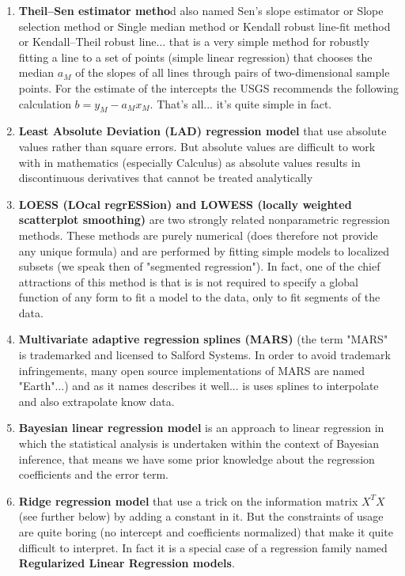 \begin{enumerate}
		\item \textbf{Theil–Sen estimator metho}d also named Sen's slope estimator or Slope selection method or Single median method or Kendall robust line-fit method or Kendall–Theil robust line... that is a very simple method for robustly fitting a line to a set of points (simple linear regression) that chooses the median $a_M$ of the slopes of all lines through pairs of two-dimensional sample points. For the estimate of the intercepts the USGS recommends the following calculation $b=y_M-a_Mx_M$. That's all... it's quite simple in fact.
		
		\item \textbf{Least Absolute Deviation (LAD) regression model} that use absolute values rather than square errors.  But absolute values are difficult to work with in mathematics (especially Calculus) as absolute values results in discontinuous derivatives that cannot be treated analytically
		
		\item \textbf{LOESS (LOcal regrESSion) and LOWESS (locally weighted scatterplot smoothing)} are two strongly related nonparametric regression methods. These methods are purely numerical (does therefore not provide any unique formula) and are performed by fitting simple models to localized subsets (we speak then of "segmented regression"). In fact, one of the chief attractions of this method is that is is not required to specify a global function of any form to fit a model to the data, only to fit segments of the data.
		
		\item \textbf{Multivariate adaptive regression splines (MARS)} (the term "MARS" is trademarked and licensed to Salford Systems. In order to avoid trademark infringements, many open source implementations of MARS are named "Earth"...) and as it names describes it well... is uses splines to interpolate and also extrapolate know data.
		
		\item \textbf{Bayesian linear regression model} is an approach to linear regression in which the statistical analysis is undertaken within the context of Bayesian inference, that means we have some prior knowledge about the regression coefficients and the error term.
		
		\item \textbf{Ridge regression model} that use a trick on the information matrix $X^TX$ (see further below) by adding a constant in it. But the constraints of usage are quite boring (no intercept and coefficients normalized) that make it quite difficult to interpret. In fact it is a special case of a regression family named \textbf{Regularized Linear Regression models}.
		

\end{enumerate}
